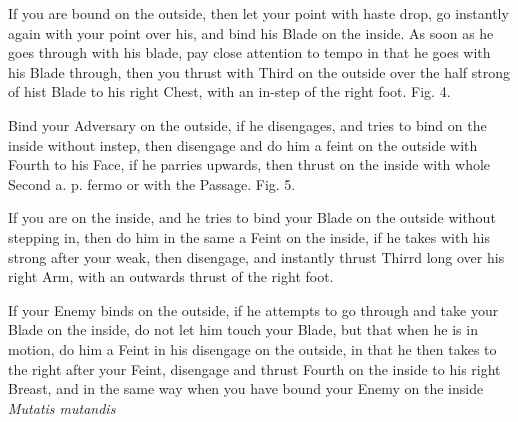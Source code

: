 If you are bound on the outside, then let your point with haste drop,
go instantly again with your point over his, and bind his Blade on the
inside. As soon as he goes through with his blade, pay close attention
to tempo in that he goes with his Blade through, then you thrust with
Third on the outside over the half strong of hist Blade to his right
Chest, with an in-step of the right foot. Fig. 4.

\exercise{}

Bind your Adversary on the outside, if he disengages, and tries to
bind on the inside without instep, then disengage and do him a feint
on the outside with Fourth to his Face, if he parries upwards, then
thrust on the inside with whole Second a. p. fermo or with the
Passage. Fig. 5.

If you are on the inside, and he tries to bind your Blade on the
outside without stepping in, then do him in the same a Feint on the
inside, if he takes with his strong after your weak, then disengage,
and instantly thrust Thirrd long over his right Arm, with an outwards
thrust of the right foot.

\exercise{}

If your Enemy binds on the outside, if he attempts to go through and take your Blade on the inside, do not let him touch your Blade, but that when he is in motion, do him a Feint in his disengage on the outside, in that he then takes to the right after your Feint, disengage and thrust Fourth on the inside to his right Breast, and in the same way when you have bound your Enemy on the inside {\it Mutatis mutandis}

